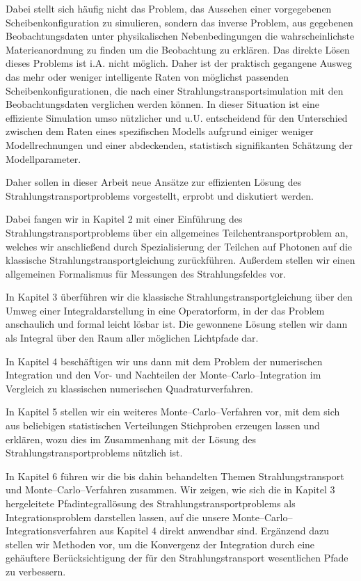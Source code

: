 	Dabei stellt sich häufig nicht das Problem, das Aussehen einer vorgegebenen Scheibenkonfiguration zu simulieren, sondern das inverse Problem, aus gegebenen Beobachtungsdaten unter physikalischen Nebenbedingungen die wahrscheinlichste Materieanordnung zu finden um die Beobachtung zu erklären. Das direkte Lösen dieses Problems ist i.A. nicht möglich. Daher ist der praktisch gegangene Ausweg das mehr oder weniger intelligente Raten von möglichst passenden Scheibenkonfigurationen, die nach einer Strahlungstransportsimulation mit den Beobachtungsdaten verglichen werden können. In dieser Situation ist eine effiziente Simulation umso nützlicher und u.U. entscheidend für den Unterschied zwischen dem Raten eines spezifischen Modells aufgrund einiger weniger Modellrechnungen und einer abdeckenden, statistisch signifikanten Schätzung der Modellparameter.
	
	Daher sollen in dieser Arbeit neue Ansätze zur effizienten Lösung des Strahlungstransportproblems vorgestellt, erprobt und diskutiert werden.
	
	Dabei fangen wir in Kapitel 2 mit einer Einführung des Strahlungstransportproblems über ein allgemeines Teilchentransportproblem an, welches wir anschließend durch Spezialisierung der Teilchen auf Photonen auf die klassische Strahlungstransportgleichung zurückführen. Außerdem stellen wir einen allgemeinen Formalismus für Messungen des Strahlungsfeldes vor.
	
	In Kapitel 3 überführen wir die klassische Strahlungstransportgleichung über den Umweg einer Integraldarstellung in eine Operatorform, in der das Problem anschaulich und formal leicht lösbar ist. Die gewonnene Lösung stellen wir dann als Integral über den Raum aller möglichen Lichtpfade dar.
	
	In Kapitel 4 beschäftigen wir uns dann mit dem Problem der numerischen Integration und den Vor- und Nachteilen der Monte--Carlo--Integration im Vergleich zu klassischen numerischen Quadraturverfahren.
	
	In Kapitel 5 stellen wir ein weiteres Monte--Carlo--Verfahren vor, mit dem sich aus beliebigen statistischen Verteilungen Stichproben erzeugen lassen und erklären, wozu dies im Zusammenhang mit der Lösung des Strahlungstransportproblems nützlich ist.
	
	In Kapitel 6 führen wir die bis dahin behandelten Themen Strahlungstransport und Monte--Carlo--Verfahren zusammen. Wir zeigen, wie sich die in Kapitel 3 hergeleitete Pfadintegrallösung des Strahlungstransportproblems als Integrationsproblem darstellen lassen, auf die unsere Monte--Carlo--Integrationsverfahren aus Kapitel 4 direkt anwendbar sind. Ergänzend dazu stellen wir Methoden vor, um die Konvergenz der Integration durch eine gehäuftere Berücksichtigung der für den Strahlungstransport wesentlichen Pfade zu verbessern.
	
